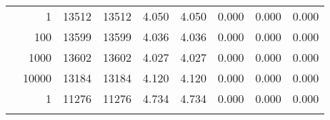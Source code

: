 \begin{table}
\begin{tabular}{rrrrrrrrr}
	            
	        
				\noalign{\smallskip}\hline
				\multirow{ 4 }{*}{ 80000 } &
				
					
					 
					\multirow{ 1 }{*}{ 1 } &
					
						
							    
							     13512  & 13512  
	                           & 4.050 & 4.050 & 0.000
	                           & 0.000 & 0.000  \\
	                
	            
					 &  
					 
					\multirow{ 1 }{*}{ 100 } &
					
						
							    
							     13599  & 13599  
	                           & 4.036 & 4.036 & 0.000
	                           & 0.000 & 0.000  \\
	                
	            
					 &  
					 
					\multirow{ 1 }{*}{ 1000 } &
					
						
							    
							     13602  & 13602  
	                           & 4.027 & 4.027 & 0.000
	                           & 0.000 & 0.000  \\
	                
	            
					 &  
					 
					\multirow{ 1 }{*}{ 10000 } &
					
						
							    
							     13184  & 13184  
	                           & 4.120 & 4.120 & 0.000
	                           & 0.000 & 0.000  \\
	                
	            
	        
				\noalign{\smallskip}\hline
				\multirow{ 4 }{*}{ 160000 } &
				
					
					 
					\multirow{ 1 }{*}{ 1 } &
					
						
							    
							     11276  & 11276  
	                           & 4.734 & 4.734 & 0.000
	                           & 0.000 & 0.000  \\
	                
	            
					 &  
					 

\end{tabular}
\end{table}
